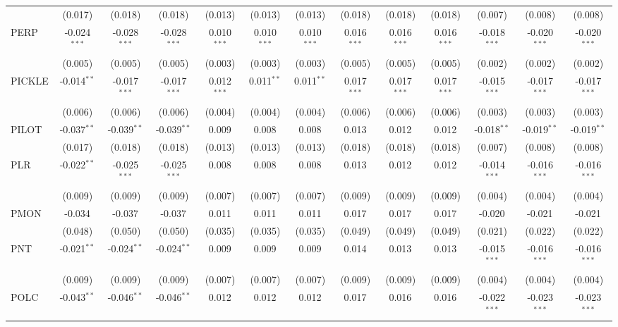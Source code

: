 \begin{table}[!htbp]
\begin{tabular}{@{\extracolsep{5pt}}lcccccccccccc}
  & (0.017) & (0.018) & (0.018) & (0.013) & (0.013) & (0.013) & (0.018) & (0.018) & (0.018) & (0.007) & (0.008) & (0.008) \\
 PERP & -0.024$^{***}$ & -0.028$^{***}$ & -0.028$^{***}$ & 0.010$^{***}$ & 0.010$^{***}$ & 0.010$^{***}$ & 0.016$^{***}$ & 0.016$^{***}$ & 0.016$^{***}$ & -0.018$^{***}$ & -0.020$^{***}$ & -0.020$^{***}$ \\
  & (0.005) & (0.005) & (0.005) & (0.003) & (0.003) & (0.003) & (0.005) & (0.005) & (0.005) & (0.002) & (0.002) & (0.002) \\
 PICKLE & -0.014$^{**}$ & -0.017$^{***}$ & -0.017$^{***}$ & 0.012$^{***}$ & 0.011$^{**}$ & 0.011$^{**}$ & 0.017$^{***}$ & 0.017$^{***}$ & 0.017$^{***}$ & -0.015$^{***}$ & -0.017$^{***}$ & -0.017$^{***}$ \\
  & (0.006) & (0.006) & (0.006) & (0.004) & (0.004) & (0.004) & (0.006) & (0.006) & (0.006) & (0.003) & (0.003) & (0.003) \\
 PILOT & -0.037$^{**}$ & -0.039$^{**}$ & -0.039$^{**}$ & 0.009$^{}$ & 0.008$^{}$ & 0.008$^{}$ & 0.013$^{}$ & 0.012$^{}$ & 0.012$^{}$ & -0.018$^{**}$ & -0.019$^{**}$ & -0.019$^{**}$ \\
  & (0.017) & (0.018) & (0.018) & (0.013) & (0.013) & (0.013) & (0.018) & (0.018) & (0.018) & (0.007) & (0.008) & (0.008) \\
 PLR & -0.022$^{**}$ & -0.025$^{***}$ & -0.025$^{***}$ & 0.008$^{}$ & 0.008$^{}$ & 0.008$^{}$ & 0.013$^{}$ & 0.012$^{}$ & 0.012$^{}$ & -0.014$^{***}$ & -0.016$^{***}$ & -0.016$^{***}$ \\
  & (0.009) & (0.009) & (0.009) & (0.007) & (0.007) & (0.007) & (0.009) & (0.009) & (0.009) & (0.004) & (0.004) & (0.004) \\
 PMON & -0.034$^{}$ & -0.037$^{}$ & -0.037$^{}$ & 0.011$^{}$ & 0.011$^{}$ & 0.011$^{}$ & 0.017$^{}$ & 0.017$^{}$ & 0.017$^{}$ & -0.020$^{}$ & -0.021$^{}$ & -0.021$^{}$ \\
  & (0.048) & (0.050) & (0.050) & (0.035) & (0.035) & (0.035) & (0.049) & (0.049) & (0.049) & (0.021) & (0.022) & (0.022) \\
 PNT & -0.021$^{**}$ & -0.024$^{**}$ & -0.024$^{**}$ & 0.009$^{}$ & 0.009$^{}$ & 0.009$^{}$ & 0.014$^{}$ & 0.013$^{}$ & 0.013$^{}$ & -0.015$^{***}$ & -0.016$^{***}$ & -0.016$^{***}$ \\
  & (0.009) & (0.009) & (0.009) & (0.007) & (0.007) & (0.007) & (0.009) & (0.009) & (0.009) & (0.004) & (0.004) & (0.004) \\
 POLC & -0.043$^{**}$ & -0.046$^{**}$ & -0.046$^{**}$ & 0.012$^{}$ & 0.012$^{}$ & 0.012$^{}$ & 0.017$^{}$ & 0.016$^{}$ & 0.016$^{}$ & -0.022$^{***}$ & -0.023$^{***}$ & -0.023$^{***}$ \\

\end{tabular}
\end{table}
